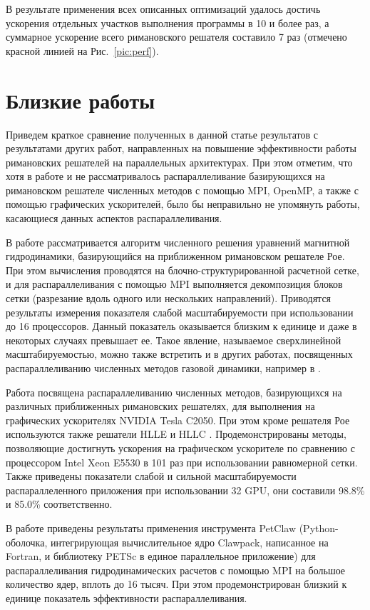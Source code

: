 \documentclass[utf8]{psta}
\begin{document}
В результате применения всех описанных оптимизаций удалось достичь ускорения отдельных участков выполнения программы в 10 и более раз, а суммарное ускорение всего римановского решателя составило 7 раз (отмечено красной линией на Рис.~\ref{pic:perf}).

\section{Близкие работы}

Приведем краткое сравнение полученных в данной статье результатов с результатами других работ, направленных на повышение эффективности работы римановских решателей на параллельных архитектурах.
При этом отметим, что хотя в работе и не рассматривалось распараллеливание базирующихся на римановском решателе численных методов с помощью MPI, OpenMP, а также с помощью графических ускорителей, было бы неправильно не упомянуть работы, касающиеся данных аспектов распараллеливания.

В работе \cite{Shumlak} рассматривается алгоритм численного решения уравнений магнитной гидродинамики, базирующийся на приближенном римановском решателе Рое.
При этом вычисления проводятся на блочно-структурированной расчетной сетке, и для распараллеливания с помощью MPI выполняется декомпозиция блоков сетки (разрезание вдоль одного или нескольких направлений).
Приводятся результаты измерения показателя слабой масштабируемости при использовании до 16 процессоров.
Данный показатель оказывается близким к единице и даже в некоторых случаях превышает ее.
Такое явление, называемое сверхлинейной масштабируемостью, можно также встретить и в других работах, посвященных распараллеливанию численных методов газовой динамики, например в \cite{Benderskij}.

Работа \cite{Schive} посвящена распараллеливанию численных методов, базирующихся на различных приближенных римановских решателях, для выполнения на графических ускорителях NVIDIA Tesla C2050.
При этом кроме решателя Рое используются также решатели HLLE и HLLC \cite{Kong}.
Продемонстрированы методы, позволяющие достигнуть ускорения на графическом ускорителе по сравнению с процессором Intel Xeon E5530 в 101 раз при использовании равномерной сетки.
Также приведены показатели слабой и сильной масштабируемости распараллеленного приложения при использовании 32 GPU, они составили 98.8\% и 85.0\% соответственно. 

В работе \cite{Mandli} приведены результаты применения инструмента PetClaw (Python-оболочка, интегрирующая вычислительное ядро Clawpack, написанное на Fortran, и библиотеку PETSc в единое параллельное приложение) для распараллеливания гидродинамических расчетов с помощью MPI на большое количество ядер, вплоть до 16 тысяч.
При этом продемонстрирован близкий к единице показатель эффективности распараллеливания.
\end{document}
